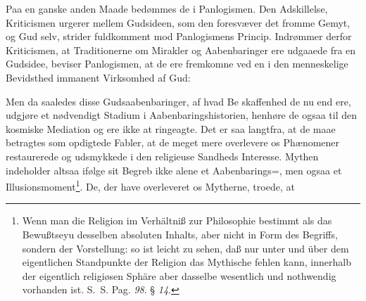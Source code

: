 \documentclass[12pt]{book}
\newcommand{\opage}[1]{\marginnote{\footnotesize\textit{[#1]}}}
\begin{document}
Paa en ganske anden Maade bedømmes de i Panlogismen. Den Adskillelse,
Kriticismen urgerer mellem Gudsideen, som den foresvæver det fromme Gemyt, og
Gud selv, strider fuldkomment mod Panlogismens Princip. Indrømmer derfor
Kriticismen, at Traditionerne om Mirakler og Aabenbaringer ere udgaaede fra en
Gudsidee, beviser Panlogismen, at de ere fremkomne ved en i den menneskelige
Bevidsthed immanent Virksomhed af Gud:

Men da saaledes disse Gudsaabenbaringer, af hvad Be\-%
\opage{132}\setcounter{footnote}{0}%
skaffenhed de nu end ere, udgjøre et nødvendigt Stadium i
Aabenbaringshistorien, henhøre de ogsaa til den kosmiske Mediation og ere ikke
at ringeagte. Det er saa langtfra, at de maae betragtes som opdigtede Fabler,
at de meget mere overlevere os Phænomener restaurerede og udsmykkede i den
religieuse Sandheds Interesse. Mythen indeholder altsaa ifølge sit Begreb ikke
alene et Aabenbarings=, men ogsaa et Illusionsmoment\footnote{Wenn man die
Religion im Verhältniß zur Philosophie bestimmt als das Bewußtseyu desselben
absoluten Inhalts, aber nicht in Form des Begriffs, sondern der Vorstellung: so
ist leicht zu sehen, daß nur unter und über dem eigentlichen Standpunkte der
Religion das Mythische fehlen kann, innerhalb der eigentlich religiøsen Sphäre
aber dasselbe wesentlich und nothwendig vorhanden ist. S.~S. Pag. \textit{98}.
§ \textit{14}.}. De, der have overleveret os Mytherne, troede, at
\end{document}
